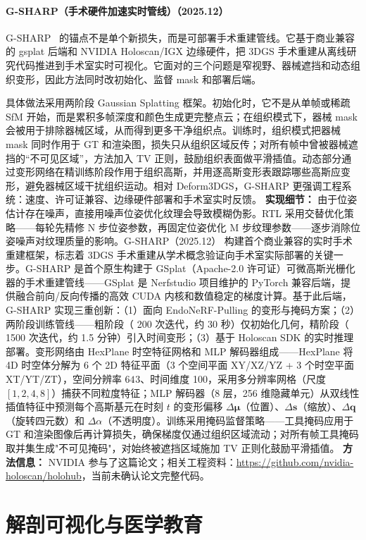 \paragraph{G-SHARP（手术硬件加速实时管线）（2025.12）}
G-SHARP~\cite{2512_02482} 的锚点不是单个新损失，而是可部署手术重建管线。它基于商业兼容的 gsplat 后端和 NVIDIA Holoscan/IGX 边缘硬件，把 3DGS 手术重建从离线研究代码推进到手术室实时可视化。它面对的三个问题是窄视野、器械遮挡和动态组织变形，因此方法同时改初始化、监督 mask 和部署后端。

具体做法采用两阶段 Gaussian Splatting 框架。初始化时，它不是从单帧或稀疏 SfM 开始，而是累积多帧深度和颜色生成更完整点云；在组织模式下，器械 mask 会被用于排除器械区域，从而得到更多干净组织点。训练时，组织模式把器械 mask 同时作用于 GT 和渲染图，损失只从组织区域反传；对所有帧中曾被器械遮挡的“不可见区域”，方法加入 TV 正则，鼓励组织表面做平滑插值。动态部分通过变形网络在精训练阶段作用于组织高斯，并用逐高斯变形表跟踪哪些高斯应变形，避免器械区域干扰组织运动。相对 Deform3DGS，G-SHARP 更强调工程系统：速度、许可证兼容、边缘硬件部署和手术室实时反馈。
\textbf{实现细节：} 由于位姿估计存在噪声，直接用噪声位姿优化纹理会导致模糊伪影。RTL 采用交替优化策略——每轮先精修 N 步位姿参数，再固定位姿优化 M 步纹理参数——逐步消除位姿噪声对纹理质量的影响。G-SHARP（2025.12） 构建首个商业兼容的实时手术重建框架，标志着 3DGS 手术重建从学术概念验证向手术室实际部署的关键一步。G-SHARP 是首个原生构建于 GSplat（Apache-2.0 许可证）可微高斯光栅化器的手术重建管线——GSplat 是 Nerfstudio 项目维护的 PyTorch 兼容后端，提供融合前向/反向传播的高效 CUDA 内核和数值稳定的梯度计算。基于此后端，G-SHARP 实现三重创新：（1）面向 EndoNeRF-Pulling 的变形与掩码方案；（2）两阶段训练管线——粗阶段（ 200 次迭代，约 30 秒）仅初始化几何，精阶段（ 1500 次迭代，约 1.5 分钟）引入时间变形；（3）基于 Holoscan SDK 的实时推理部署。变形网络由 HexPlane 时空特征网格和 MLP 解码器组成——HexPlane 将 4D 时空体分解为 6 个 2D 特征平面（3 个空间平面 XY/XZ/YZ + 3 个时空平面 XT/YT/ZT），空间分辨率 $64^{}3$、时间维度 100，采用多分辨率网格（尺度 $[1,2,4,8]$）捕获不同粒度特征；MLP 解码器（8 层，256 维隐藏单元）从双线性插值特征中预测每个高斯基元在时刻 $t$ 的变形偏移 $\Delta\bm{\mu}$（位置）、$\Delta\bm{s}$（缩放）、$\Delta\bm{q}$（旋转四元数）和 $\Delta\alpha$（不透明度）。训练采用掩码监督策略——工具掩码应用于 GT 和渲染图像后再计算损失，确保梯度仅通过组织区域流动；对所有帧工具掩码取并集生成"不可见掩码"，对始终被遮挡区域施加 TV 正则化鼓励平滑插值。
\textbf{方法信息：} NVIDIA 参与了这篇论文；相关工程资料：\url{https://github.com/nvidia-holoscan/holohub}，当前未确认论文完整代码。
\section{解剖可视化与医学教育}

